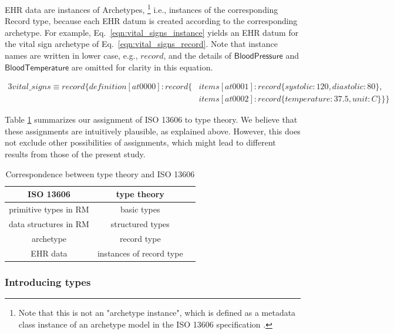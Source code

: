 \documentclass[preprint,3p,onecolumn,times,review]{elsarticle}
\begin{document}
EHR data are instances of Archetypes, \footnote{Note that this is not an "archetype instance", which is defined as a metadata class instance of an archetype model in the ISO 13606 specification \cite[p.2]{iso08:13606_healt_elect_part1}.} i.e., instances of the corresponding Record type, because each EHR datum is created according to the corresponding archetype.
For example, Eq.~\ref{eqn:vital_signs_instance} yields an EHR datum for the vital sign archetype of Eq.~\ref{eqn:vital_signs_record}.
Note that instance names are written in lower case, e.g., $record$, and the details of $\mathsf{BloodPressure}$ and $\mathsf{BloodTemperature}$ are omitted for clarity in this equation.


\begin{alignat}{3}
  vital\_signs \equiv record\{definition[at0000] : record\{&items[at0001] : record\{systolic: 120, diastolic : 80\},\nonumber\\
                                                                    &items[at0002] : record\{temperature: 37.5, unit : C\}\}\} \label{eqn:vital_signs_instance}
\end{alignat}


Table \ref{tab:correspondence} summarizes our assignment of ISO 13606 to type theory.
We believe that these assignments are intuitively plausible, as explained above.
However, this does not exclude other possibilities of assignments, which might lead to different results from those of the present study.

\begin{table}[!htbp]
  \centering
  \caption{Correspondence between type theory and ISO 13606}\label{tab:correspondence}
  \begin{tabular}{ccc}
    \toprule%
    ISO 13606 & type theory \\
    \midrule
    primitive types in RM & basic types \\
    data structures in RM & structured types \\
    archetype & record type \\
    EHR data & instances of record type\\
    \bottomrule%
  \end{tabular}
\end{table}


\subsubsection{Introducing types}
\end{document}
